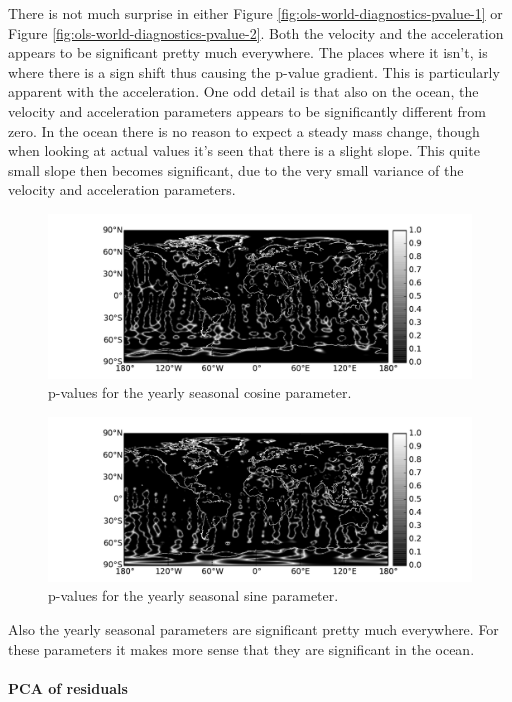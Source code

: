 There is not much surprise in either Figure \ref{fig:ols-world-diagnostics-pvalue-1} or Figure \ref{fig:ols-world-diagnostics-pvalue-2}. Both the velocity and the acceleration appears to be significant pretty much everywhere. The places where it isn't, is where there is a sign shift thus causing the p-value gradient. This is particularly apparent with the acceleration. One odd detail is that also on the ocean, the velocity and acceleration parameters appears to be significantly different from zero. In the ocean there is no reason to expect a steady mass change, though when looking at actual values it's seen that there is a slight slope. This quite small slope then becomes significant, due to the very small variance of the velocity and acceleration parameters. 

\begin{figure}[H]
	\centering
	\includegraphics[width=\textwidth]{figures/ols-world-diagnostics-pvalue-3}
	\caption{p-values for the yearly seasonal cosine parameter.}
	\label{fig:ols-world-diagnostics-pvalue-3}
\end{figure}

\begin{figure}[H]
	\centering
	\includegraphics[width=\textwidth]{figures/ols-world-diagnostics-pvalue-4}
	\caption{p-values for the yearly seasonal sine parameter.}
	\label{fig:ols-world-diagnostics-pvalue-4}
\end{figure}

Also the yearly seasonal parameters are significant pretty much everywhere. For these parameters it makes more sense that they are significant in the ocean.


\paragraph{PCA of residuals}
